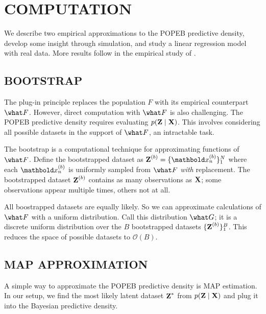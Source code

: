 
\section{COMPUTATION}
\label{sec:computation}

We describe two empirical approximations to the \gls{POPEB} predictive density,
develop some insight through simulation, and study a linear regression model
with real data. More results follow in the empirical study of
.

\subsection{BOOTSTRAP}

The plug-in principle replaces the population $F$ with its
empirical counterpart $\what F$.
However, direct computation with $\what F$ is also challenging.
The \gls{POPEB} predictive density requires evaluating $p(\textbf{Z}\mid\textbf{X})$. This
involves considering all possible datasets in the support of $\what F$, an
intractable task.

The bootstrap is a computational technique for approximating functions of
$\what F$. Define the bootstrapped dataset as
$\mbZ^{(b)} = \{ \mb{x}^{(b)}_n \}_1^N$
where each $\mb{x}^{(b)}_n$ is uniformly sampled from $\what F$ \emph{with}
replacement. The bootstrapped dataset $\textbf{Z}^{(b)}$ contains as many
observations as $\textbf{X}$; some observations appear multiple times, others not at
all.

All boostrapped datasets are equally likely. So we can approximate
calculations of $\what F$ with a uniform distribution.
Call this distribution $\what G$; it is a discrete uniform distribution
over the $B$ bootstrapped datasets $ \{ \textbf{Z}^{(b)} \}_1^B$.
This reduces the space of possible datasets to $\mathcal{O}(B)$.


\subsection{MAP APPROXIMATION}
\label{sub:map_approx}

A simple way to approximate the \gls{POPEB} predictive density is
\gls{MAP} estimation.
In our setup, we find the most likely latent dataset $\textbf{Z}^*$ from
$p(\textbf{Z}\mid\textbf{X})$ and plug it into the Bayesian predictive density.

